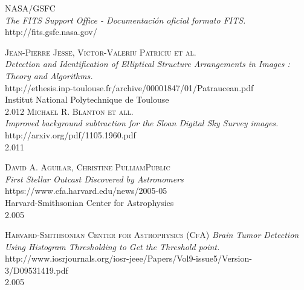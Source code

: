 \begin{thebibliography}{1}
	  		  		
  		\textsc{NASA/GSFC} \\
  		\textit{The FITS Support Office - Documentación oficial formato FITS.}
  		\\http://fits.gsfc.nasa.gov/
	  	
	  	\textsc{ Jean-Pierre Jesse, Victor-Valeriu Patriciu et al.} \\
	  	\textit{Detection and Identification of Elliptical Structure Arrangements in Images : Theory and Algorithms.}
	  	\\http://ethesis.inp-toulouse.fr/archive/00001847/01/Patraucean.pdf
	  	\\Institut National Polytechnique de Toulouse
	  	\\2.012
	  	\textsc{Michael R. Blanton et all.} \\
	  	\textit{Improved background subtraction for the Sloan Digital Sky Survey images.}
	  	\\http://arxiv.org/pdf/1105.1960.pdf 
	  	\\2.011
	  		  	
	  	\textsc{ David A. Aguilar, Christine PulliamPublic } \\
	  	\textit{First Stellar Outcast Discovered by Astronomers}
	  	\\https://www.cfa.harvard.edu/news/2005-05
	  	\\Harvard-Smithsonian Center for Astrophysics
	  	\\2.005
	  	
	  	\textsc{ Harvard-Smithsonian Center for Astrophysics (CfA) } 
	  	\textit{Brain Tumor Detection Using Histogram Thresholding to Get the Threshold point.}
	  	\\http://www.iosrjournals.org/iosr-jeee/Papers/Vol9-issue5/Version-3/D09531419.pdf
	  	\\2.005
	\end{thebibliography}

